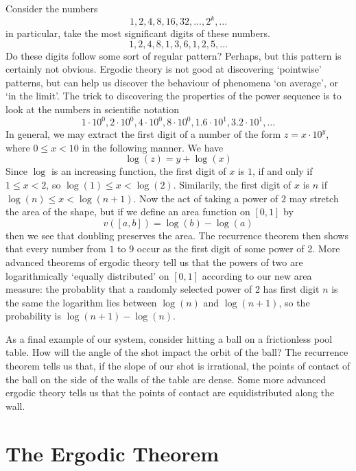 \begin{example}
    Consider the numbers
    \[ 1, 2, 4, 8, 16, 32, \dots, 2^k, \dots \]
    in particular, take the most significant digits of these numbers.
    \[ 1, 2, 4, 8, 1, 3, 6, 1, 2, 5, \dots \]
    Do these digits follow some sort of regular pattern? Perhaps, but this pattern is certainly not obvious. Ergodic theory is not good at discovering `pointwise' patterns, but can help us discover the behaviour of phenomena `on average', or `in the limit'. The trick to discovering the properties of the power sequence is to look at the numbers in scientific notation
    \[ 1 \cdot 10^0, 2 \cdot 10^0, 4 \cdot 10^0, 8 \cdot 10^0, 1.6 \cdot 10^1, 3.2 \cdot 10^1, \dots \]
    In general, we may extract the first digit of a number of the form $z = x \cdot 10^y$, where $0 \leq x < 10$ in the following manner. We have
    \[ \log(z) = y + \log(x) \]
    Since $\log$ is an increasing function, the first digit of $x$ is $1$, if and only if $1 \leq x < 2$, so $\log(1) \leq x < \log(2)$. Similarily, the first digit of $x$ is $n$ if $\log(n) \leq x < \log(n+1)$. Now the act of taking a power of $2$ may stretch the area of the shape, but if we define an area function on $[0,1]$ by
    \[ v([a,b]) = \log(b) - \log(a) \]
    then we see that doubling preserves the area. The recurrence theorem then shows that every number from $1$ to $9$ occur as the first digit of some power of 2. More advanced theorems of ergodic theory tell us that the powers of two are logarithmically `equally distributed' on $[0,1]$ according to our new area measure: the probablity that a randomly selected power of 2 has first digit $n$ is the same the logarithm lies between $\log(n)$ and $\log(n+1)$, so the probability is $\log(n+1) - \log(n)$.
\end{example}

As a final example of our system, consider hitting a ball on a frictionless pool table. How will the angle of the shot impact the orbit of the ball? The recurrence theorem tells us that, if the slope of our shot is irrational, the points of contact of the ball on the side of the walls of the table are dense. Some more advanced ergodic theory tells us that the points of contact are equidistributed along the wall.

\chapter{The Ergodic Theorem}

